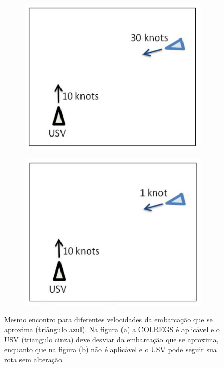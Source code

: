     \begin{figure}
    \centering
    
        \begin{subfigure}{0.4\textwidth}
            \centering
            \includegraphics[width=\textwidth]{fig/chap1/colregs_applicable.png}
            \caption{}
            \label{fig:Kuwata2014_colregApplicable}
        \end{subfigure}
        \begin{subfigure}{0.4\textwidth}
            \centering
            \includegraphics[width=\textwidth]{fig/chap1/colregs_na.png}
            \caption{}
            \label{fig:Kuwata2014_colregNA}
        \end{subfigure}
    
    \caption{Mesmo encontro para diferentes velocidades da embarcação que se aproxima (triângulo azul). Na figura (a) a COLREGS é aplicável e o USV (triangulo cinza) deve desviar da embarcação que se aproxima, enquanto que na figura (b) não é aplicável e o USV pode seguir sua rota sem alteração}
    \label{fig:Kuwata2014_colregsInterpretation}
    \end{figure}
    

